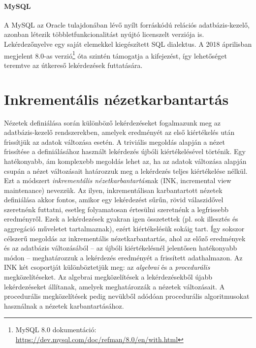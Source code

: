 \paragraph{MySQL} A MySQL az Oracle tulajdonában lévő nyílt forráskódú relációs adatbázis-kezelő, azonban létezik többletfunkcionalitást nyújtó licenszelt verziója is. Lekérdezőnyelve egy saját elemekkel kiegészített SQL dialektus. A 2018 áprilisban megjelent 8.0-as verzió\footnote{MySQL 8.0 dokumentáció: \url{https://dev.mysql.com/doc/refman/8.0/en/with.html}} óta szintén támogatja a  kifejezést, így lehetőséget teremtve az útkereső lekérdezések futtatására.

\section{Inkrementális nézetkarbantartás}

Nézetek definiálása során különböző lekérdezéseket fogalmazunk meg az adatbázis-kezelő rendszerekben, amelyek eredményét az első kiértékelés után frissítjük az adatok változása esetén. A triviális megoldás alapján a nézet frissítése a definiálásához használt lekérdezés újbóli kiértékelésével történik. Egy hatékonyabb, ám komplexebb megoldás lehet az, ha az adatok változása alapján csupán a nézet változásait határozzuk meg a lekérdezés teljes kiértékelése nélkül. Ezt a módszert \emph{inkrementális nézetkarbantartás}nak (INK, incremental view maintenance) nevezzük.
Az ilyen, inkrementálisan karbantartott nézetek definiálása akkor fontos, amikor egy lekérdezést sűrűn, rövid válaszidővel szeretnénk futtatni, esetleg folyamatosan értesülni szeretnénk a legfrissebb eredményről. Ezek a lekérdezések gyakran igen összetettek (pl. sok illesztés és aggregáció műveletet tartalmaznak), ezért kiértékelésük sokáig tart. Így sokszor célszerű megoldás az inkrementális nézetkarbantartás, ahol az előző eredmények és az adatbázis változásából -- az újbóli kiértékelésnél jelentősen hatékonyabb módon -- meghatározzuk a lekérdezés eredményét a frissített adathalmazon. Az INK két csoportját különböztetjük meg: az \emph{algebrai} és a \emph{procedurális} megközelítéseket. Az algebrai megközelítések a lekérdezésekből újabb lekérdezéseket állítanak, amelyek meghatározzák a nézetek változásait. A procedurális megközelítések pedig nevükből adódóan procedurális algoritmusokat használnak a nézetek karbantartásához.

